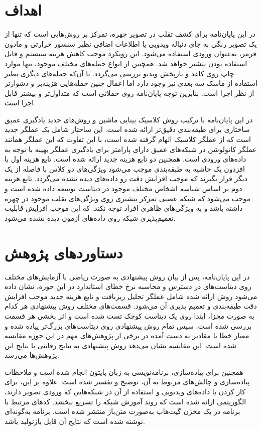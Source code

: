 \section{اهداف}
در این پایان‌نامه برای کشف تقلب در تصویر چهره، تمرکز بر روش‌هایی است که تنها از یک تصویر رنگی به جای دنباله ویدویی یا اطلاعات اضافی نظیر سنسور حرارتی و مادون قرمز، به‌عنوان ورودی استفاده می‌شود. این رویکرد موجب کاهش هزینه سیستم و قابل استفاده بودن بیشتر خواهد شد. همچنین از انواع حمله‌های مختلف موجود، تنها موارد چاپ روی کاغذ و بازپخش ویدیو بررسی می‌گردد. با آن‌که حمله‌های دیگری نظیر استفاده از ماسک سه بعدی نیز وجود دارد اما اعمال چنین حمله‌هایی هزینه‌بر و دشوارتر از نظر اجرا است. بنابرین توجه پایان‌نامه روی حملاتی است که متداول‌تر و بیشتر قابل اجرا است. 

در این پایان‌نامه با ترکیب روش کلاسیک بینایی ماشین و روش‌های جدید یادگیری عمیق ساختاری برای طبقه‌بندی دقیق‌تر ارائه شده است. این ساختار شامل یک عملگر جدید است که از عملگر  کلاسیک الهام گرفته شده است، با این تفاوت که این عملگر همانند عملگر کانولوشن در شبکه‌های عمیق دارای پارامتر برای یادگیری عملگر بهینه با توجه به داده‌های ورودی است. 
همچنین دو تابع هزینه جدید ارائه شده است. تابع هزینه اول با افزدون یک حاشیه به طبقه‌بندی موجب می‌شود ویژگی‌های دو کلاس با فاصله از یک دیگر قرار بگیرند که موجب افزایش دقت رو داده‌های دیده نشده می‌گردد. تابع هزینه دوم بر اساس شناسه اشخاص مختلف موجود در دیتاست توسعه داده شده است و موجب می‌شود که شبکه عصبی تمرکز بیشتری روی ویژگی‌های تقلب موجود در چهره داشته باشد و به ویژگی‌های ظاهری افراد توجه نکند. که این موجب افزایش قابلیت تعمیم‌پذیری شبکه روی داده‌های آزمون دیده نشده می‌شود.
\section{دستاورد‌های پژوهش}
در این پایان‌نامه، پس از بیان روش پیشنهادی به صورت ریاضی با آزمایش‌های مختلف روی دیتاست‌های در دسترس و محاسبه نرخ خطای استاندارد در این حوزه، نشان داده می‌شود روش ارائه شده شامل عملگر تحلیل ریزبافت و تابع هزینه جدید موجب افزایش دقت طبقه‌بندی و تعمیم پذیری آن می‌شود. قسمت‌های مختلف روش پیشنهادی هر کدام به صورت مجزا، ابتدا روی یک دیتاست کوچک تست شده است و اثر بخشی هر قسمت بررسی شده است. سپس تمام روش پیشنهادی روی دیتاست‌های بزرگ‌تر پیاده شده و معیار خطا با مقادیر به دست آمده در برخی از پژوهش‌های مهم در این حوزه مقایسه شده است. این مقایسه نشان می‌دهد روش پیشنهادی به نتایج رقابتی با نتایج این پژوهش‌ها می‌رسد. 

همچنین برای پیاده‌سازی، برنامه‌نویسی به زبان پایتون انجام شده است و ملاحظات پیاده‌سازی و چالش‌های مربوط به آن، توضیح و تفسیر شده است. علاوه بر این، برای کار کردن با داده‌های ویدیویی و استفاده از آن در شبکه‌هایی که ورودی تصویر دارند، الگوریتمی ارائه شده است که روند آموزش شبکه را تسریع ببخشد. کدهای مرتبط با برنامه در یک مخزن گیت‌هاب
 به‌صورت متن‌باز منتشر شده است. برنامه به‌گونه‌ای نوشته شده است که نتایج آن قابل بازتولید باشد.
